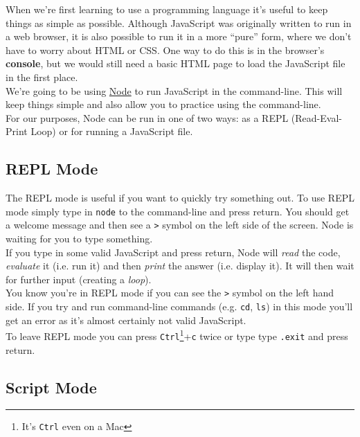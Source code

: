 When we're first learning to use a programming language it's useful to keep things as simple as possible. Although JavaScript was originally written to run in a web browser, it is also possible to run it in a more ``pure'' form, where we don't have to worry about HTML or CSS. One way to do this is in the browser's \textbf{console}, but we would still need a basic HTML page to load the JavaScript file in the first place.
\\

We're going to be using \href{https://nodejs.org/}{Node} to run JavaScript in the command-line. This will keep things simple and also allow you to practice using the command-line.
\\

For our purposes, Node can be run in one of two ways: as a REPL (Read-Eval-Print Loop) or for running a JavaScript file.

\subsection{REPL Mode}

The REPL mode is useful if you want to quickly try something out. To use REPL mode simply type in \texttt{node} to the command-line and press return. You should get a welcome message and then see a \texttt{>} symbol on the left side of the screen. Node is waiting for you to type something.
\\

If you type in some valid JavaScript and press return, Node will \textit{read} the code, \textit{evaluate} it (i.e. run it) and then \textit{print} the answer (i.e. display it). It will then wait for further input (creating a \textit{loop}).
\\

You know you're in REPL mode if you can see the \texttt{>} symbol on the left hand side. If you try and run command-line commands (e.g. \texttt{cd}, \texttt{ls}) in this mode you'll get an error as it's almost certainly not valid JavaScript.
\\

To leave REPL mode you can press \texttt{Ctrl}\footnote{It's \texttt{Ctrl} even on a Mac}+\texttt{c} twice or type type \texttt{.exit} and press return.


\subsection{Script Mode}

